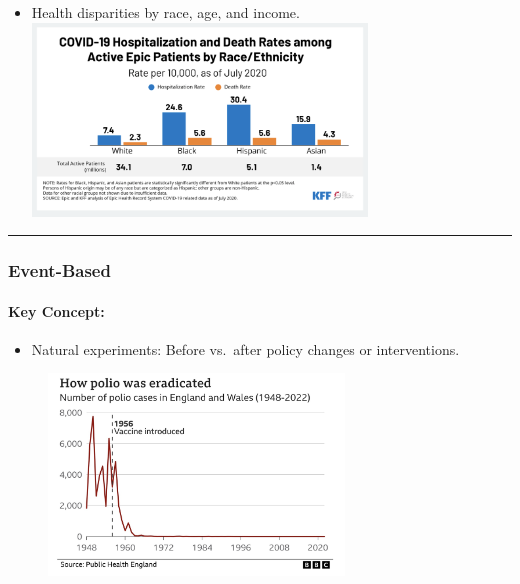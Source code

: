 \documentclass[
  letterpaper,
  DIV=11,
  numbers=noendperiod]{scrartcl}
\let\oldparagraph\paragraph
\renewcommand{\paragraph}[1]{\oldparagraph{#1}\mbox{}}
\providecommand{\tightlist}{%
  \setlength{\itemsep}{0pt}\setlength{\parskip}{0pt}}\usepackage{longtable,booktabs,array}
\begin{document}
\begin{itemize}
\tightlist
\item
  Health disparities by race, age, and income.
  \includegraphics[width=0.7\textwidth,height=\textheight]{week2_files/imgs/covid19.png}
\end{itemize}

\begin{center}\rule{0.5\linewidth}{0.5pt}\end{center}

\hypertarget{event-based}{%
\subsubsection{\texorpdfstring{{\textbf{Event-Based}}}{Event-Based}}\label{event-based}}

\hypertarget{key-concept}{%
\paragraph{Key Concept:}\label{key-concept}}

\begin{itemize}
\tightlist
\item
  Natural experiments: Before vs.~after policy changes or interventions.
\end{itemize}

\begin{figure}

{\centering \includegraphics[width=0.7\textwidth,height=\textheight]{week2_files/imgs/polio.jpg}

}

\end{figure}
\end{document}
